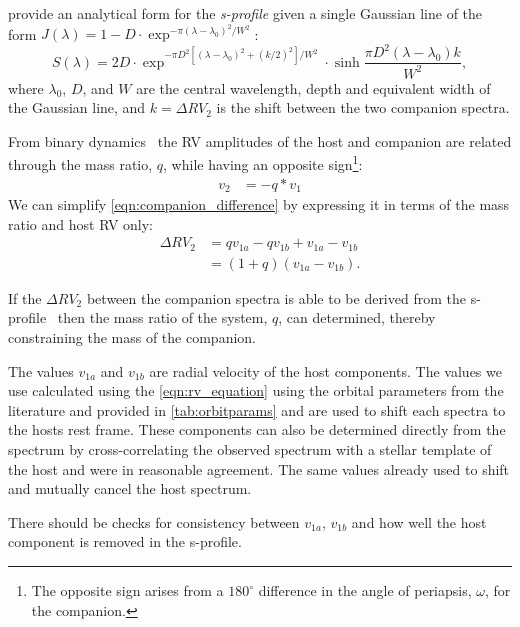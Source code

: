 \citet{ferluga_separating_1997} provide an analytical form for the \emph{s-profile} given a single Gaussian line of the form
$J(\lambda) = 1- D \cdot\exp^{{-\pi {(\lambda - \lambda_0)}^2} / {{W}^{2}}}$:
\begin{equation}
    S(\lambda) = 2 D\cdot\exp^{{-\pi {D}^{2} [{(\lambda - \lambda_0)}^{2} +{(k/2)}^{2}]}/{{W}^{2}}} \cdot \sinh{\frac{\pi {D}^{2}(\lambda-\lambda_0)k}{{W}^{2}}},\label{eqn:sprofile_gaussain}
\end{equation}
where $\lambda_0$, $D$, and $W$ are the central wavelength, depth and equivalent width of the Gaussian line, and $k=\Delta {RV}_2 $ is the shift between the two companion spectra.


From binary dynamics~\citep[e.g.][]{murray_keplerian_2010} the {RV} amplitudes of the host and companion are related through the mass ratio, \(q\), while having an opposite sign\footnote{The opposite sign arises from a \(180^\circ\) difference in the angle of periapsis, \(\omega\), for the companion.}:
\begin{align}
v_{2} &= -q * v_{1} \label{eqn:q_relation}
\end{align}
We can simplify \cref{eqn:companion_difference} by expressing it in terms of the mass ratio and host {RV} only:
\begin{align}
\Delta RV_2 &= q v_{1a} - q v_{1b} + v_{1a} - v_{1b} \nonumber \\
&= (1 + q)(v_{1a} - v_{1b}). \label{eqn:companion_difference_simplified}
\end{align}

If the \(\Delta {RV}_2\) between the companion spectra is able to be derived from the s-profile~\citep[see][]{ferluga_separating_1997} then the mass ratio of the system, \(q\), can determined, thereby constraining the mass of the companion.

The values \(v_{1a}\) and \(v_{1b}\) are radial velocity of the host components.
The values we use calculated using the \cref{eqn:rv_equation} using the orbital parameters from the literature and provided in \cref{tab:orbitparams} and are used to shift each spectra to the hosts rest frame.
These components can also be determined directly from the spectrum by cross-correlating the observed spectrum with a stellar template of the host and were in reasonable agreement.
The same values already used to shift and mutually cancel the host spectrum.

There should be checks for consistency between \(v_{1a}\), \(v_{1b}\) and how well the host component is removed in the s-profile.

